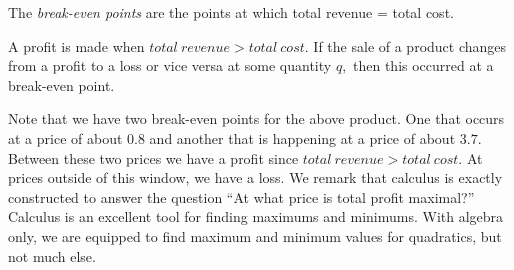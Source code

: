 \begin{definition}
    The \emph{break-even points} are the points at which total revenue = total cost.
\end{definition}

A profit is made when \(total \ revenue > total \ cost.\) If the sale of a product changes from a profit to a loss or vice versa at some quantity \(q,\) then this occurred at a break-even point.

\begin{image}
\end{image}

Note that we have two break-even points for the above product. One that occurs at a price of about \(0.8\) and another that is happening at a price of about \(3.7.\) Between these two prices we have a profit since \(total \ revenue > total \ cost.\) At prices outside of this window, we have a loss. We remark that calculus is exactly constructed to answer the question ``At what price is total profit maximal?'' Calculus is an excellent tool for finding maximums and minimums. With algebra only, we are equipped to find maximum and minimum values for quadratics, but not much else.